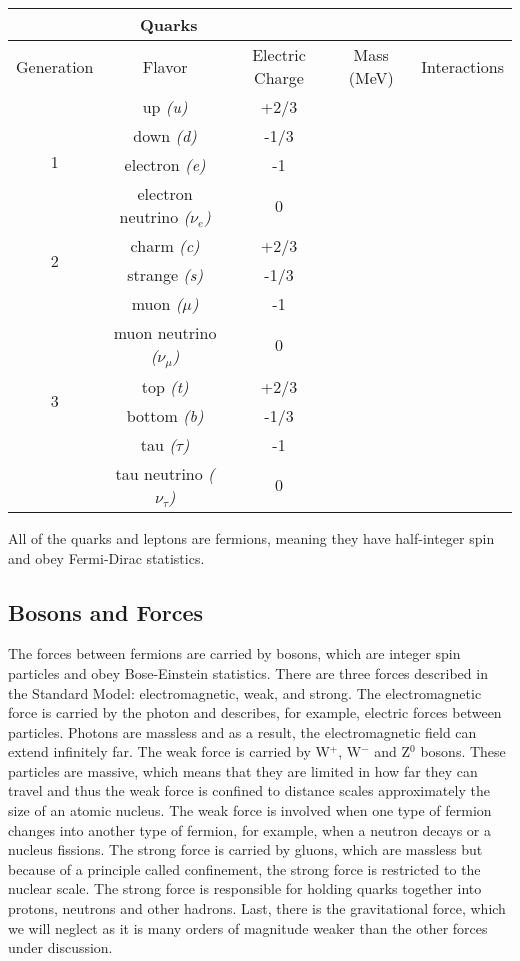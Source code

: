 \documentclass[11pt]{article}
\begin{document}
\begin{table}
	\begin{tabular}{| c || c | c | c | c |}
		\multicolumn{3}{c}{Quarks} \\
		\hline
		Generation &  Flavor & Electric Charge & Mass (MeV) & Interactions\\
		\hline
		\multirow{4}{*}{1} & up \it{(u)} & +2/3 \\
		    & down \it{(d)} & -1/3  \\
		    & electron \it{(e)}& -1 \\
		    & electron neutrino \it{($\nu_{e}$)} & 0 \\
		\hline
		\multirow{2}{*}{2} & charm \it{(c)} & +2/3 \\
		    & strange \it{(s)} & -1/3 \\
		    & muon \it{($\mu$)} & -1 \\
		    & muon neutrino \it{($\nu_{\mu}$)} & 0 \\
		\hline 
		\multirow{2}{*}{3} & top \it{(t)} & +2/3 \\
		    & bottom \it{(b)} & -1/3  \\ 
		    & tau \it{($\tau$)} & -1 \\
		    & tau neutrino \it{($\nu_{\tau}$)} & 0 \\		    
		\hline
	\end{tabular}
	\label{tab:QLTable}
\end{table}

All of the quarks and leptons are fermions, meaning they have half-integer spin and obey Fermi-Dirac statistics.

\subsection{Bosons and Forces}

The forces between fermions are carried by bosons, which are integer spin particles and obey Bose-Einstein statistics.  There are three forces described in the Standard Model: electromagnetic, weak, and strong.  The electromagnetic force is carried by the photon and describes, for example, electric forces between particles.  Photons are massless and as a result, the electromagnetic field can extend infinitely far.  The weak force is carried by W$^+$, W$^-$ and Z$^0$ bosons.  These particles are massive, which means that they are limited in how far they can travel and thus the weak force is confined to distance scales approximately the size of an atomic nucleus.  The weak force is involved when one type of fermion changes into another type of fermion, for example, when a neutron decays or a nucleus fissions.  The strong force is carried by gluons, which are massless but because of a principle called confinement, the strong force is restricted to the nuclear scale.  The strong force is responsible for holding quarks together into protons, neutrons and other hadrons. Last, there is the gravitational force, which we will neglect as it is many orders of magnitude weaker than the other forces under discussion.
\end{document}
